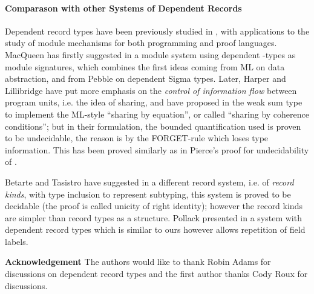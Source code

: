 \documentclass[submission,copyright,creativecommons]{eptcs}
\begin{document}
{\paragraph{Comparason with other Systems of Dependent Records}
\par{Dependent record types have been previously studied in \cite{MacQ:module86, Harper-Lillibridge93, bet-tar:subtyping98, Pollack:records02, ctp:semantic-records05}, with applications to the study of module mechanisms for both programming and proof languages.
MacQueen has firstly suggested in \cite{MacQ:module86} a module system using dependent -types as module signatures, which combines the first ideas coming from ML on data abstraction, and from Pebble on dependent Sigma types.
Later, Harper and Lillibridge have put more emphasis on the \emph{control of information flow} between program units, i.e. the idea of sharing, and have proposed in \cite{Harper-Lillibridge93} the weak sum type to implement the ML-style ``sharing by equation'', or called ``sharing by coherence conditions''; but in their formulation, the bounded quantification used is proven to be undecidable, the reason is by the FORGET-rule which loses type information. This has been proved similarly as in Pierce's proof for undecidability of  \cite{Pie94}.  }

\par{Betarte and Tasistro have suggested in \cite{bet-tar:subtyping98} a different record system, i.e. of \emph{record kinds},
with type inclusion to represent subtyping, this system is proved to be decidable (the proof is called unicity of right identity); however the record kinds are simpler than record types as a structure.
Pollack presented in \cite{Pollack:records02} a system with dependent record types which is similar to ours however allows repetition of field labels. }





}

\vspace{0.6cm}

\noindent\textbf{Acknowledgement} The authors would like to thank Robin Adams for discussions on dependent record types and the first author thanks Cody Roux for discussions.



\end{document}
